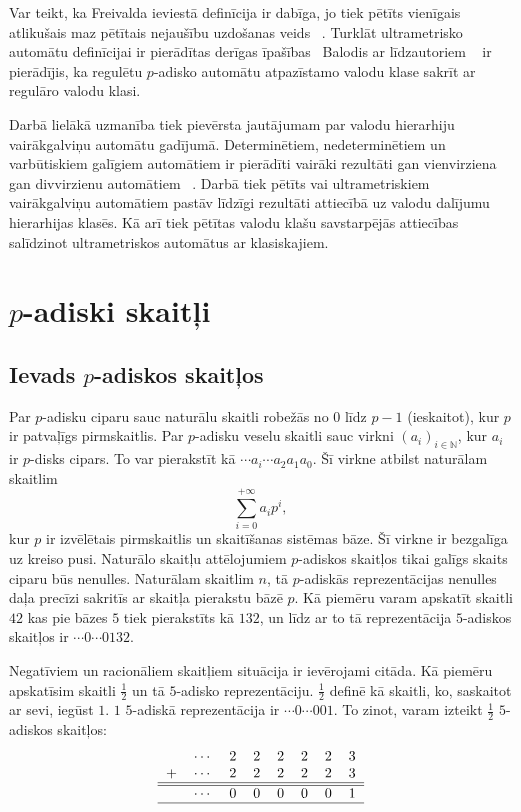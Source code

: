 \documentclass{ludis}
\begin{document}
Var teikt, ka Freivalda ieviestā definīcija ir dabīga, jo tiek pētīts vienīgais atlikušais maz pētītais nejaušību uzdošanas veids ~\citep{Freivalds2012}. Turklāt ultrametrisko automātu definīcijai ir pierādītas derīgas īpašības \textendash\ Balodis ar līdzautoriem ~\citep{KasparsBalodis2013} ir pierādījis, ka regulētu $p$-adisko automātu atpazīstamo valodu klase sakrīt ar regulāro valodu klasi.

Darbā lielākā uzmanība tiek pievērsta jautājumam par valodu hierarhiju vairākgalviņu automātu gadījumā. Determinētiem, nedeterminētiem un varbūtiskiem galīgiem automātiem ir pierādīti vairāki rezultāti gan vienvirziena gan divvirzienu automātiem ~\citep{Holzer2009,Yao1978,Monien1980,Macarie1995}. Darbā tiek pētīts vai ultrametriskiem vairākgalviņu automātiem pastāv līdzīgi rezultāti attiecībā uz valodu dalījumu hierarhijas klasēs. Kā arī tiek pētītas valodu klašu savstarpējās attiecības salīdzinot ultrametriskos automātus ar klasiskajiem.
\chapter{$p$-adiski skaitļi}
\section{Ievads $p$-adiskos skaitļos}
Par $p$-adisku ciparu sauc naturālu skaitli robežās no $0$ līdz $p-1$ (ieskaitot), kur $p$ ir patvaļīgs pirmskaitlis. Par $p$-adisku veselu skaitli sauc virkni $(a_i)_{i \in \mathbb{N}}$, kur $a_i$ ir $p$-disks cipars. To var pierakstīt kā $\cdots a_i \cdots a_2a_1a_0$.
Šī virkne atbilst naturālam skaitlim
\[\sum\limits_{i=0}^{+\infty}a_ip^i,
\]
kur $p$ ir izvēlētais pirmskaitlis un skaitīšanas sistēmas bāze. Šī virkne ir bezgalīga uz kreiso pusi. Naturālo skaitļu attēlojumiem $p$-adiskos skaitļos tikai galīgs skaits ciparu būs nenulles. Naturālam skaitlim $n$, tā $p$-adiskās reprezentācijas nenulles daļa precīzi sakritīs ar skaitļa pierakstu bāzē $p$. Kā piemēru varam apskatīt skaitli $42$ kas pie bāzes $5$ tiek pierakstīts kā $132$, un līdz ar to tā reprezentācija $5$-adiskos skaitļos ir $\cdots 0 \cdots 0132$.

Negatīviem un racionāliem skaitļiem situācija ir ievērojami citāda. Kā piemēru apskatīsim skaitli $\frac{1}{2}$ un tā $5$-adisko reprezentāciju. $\frac{1}{2}$ definē kā skaitli, ko, saskaitot ar sevi, iegūst $1$. $1$ $5$-adiskā reprezentācija ir $\cdots 0 \cdots 001$. To zinot, varam izteikt $\frac{1}{2}$ $5$-adiskos skaitļos:
\[
\begin{tabular}{rrrrrrrrr|}
&$\cdots$ &2 &2 &2 &2 &2 &3\\
+&$\cdots$ &2 &2 &2 &2 &2 &3\\
\hline
\hline
&$\cdots$ &0 &0 &0 &0 &0 &1\\
\hline
\end{tabular}
\]
\end{document}
